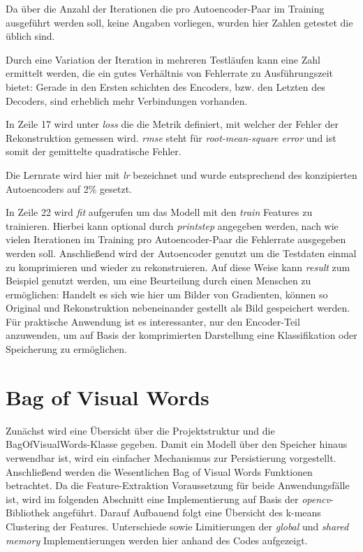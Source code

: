 Da über die Anzahl der Iterationen die pro Autoencoder-Paar im Training ausgeführt werden soll, keine Angaben vorliegen, wurden hier Zahlen getestet die üblich sind. 

Durch eine Variation der Iteration in mehreren Testläufen kann eine Zahl ermittelt werden, die ein gutes Verhältnis von Fehlerrate zu Ausführungszeit bietet: Gerade in den Ersten schichten des Encoders, bzw. den Letzten des Decoders, sind erheblich mehr Verbindungen vorhanden. 

In Zeile 17 wird unter \textit{loss} die die Metrik definiert, mit welcher der Fehler der Rekonstruktion gemessen wird. \textit{rmse} steht für \textit{root-mean-square error} und ist somit der gemittelte quadratische Fehler. 

Die Lernrate wird hier mit \textit{lr} bezeichnet und wurde entsprechend des konzipierten Autoencoders auf 2\% gesetzt.

In Zeile 22 wird \textit{fit} aufgerufen um das Modell mit den \textit{train} Features zu trainieren. Hierbei kann optional durch \textit{print\textunderscore step} angegeben werden, nach wie vielen Iterationen im Training pro Autoencoder-Paar die Fehlerrate ausgegeben werden soll.
Anschließend wird der Autoencoder genutzt um die Testdaten einmal zu komprimieren und wieder zu rekonstruieren. Auf diese Weise kann \textit{result} zum Beispiel genutzt werden, um eine Beurteilung durch einen Menschen zu ermöglichen: Handelt es sich wie hier um Bilder von Gradienten, können so Original und Rekonstruktion nebeneinander gestellt als Bild gespeichert werden. Für praktische Anwendung ist es interessanter, nur den Encoder-Teil anzuwenden, um auf Basis der komprimierten Darstellung eine Klassifikation oder Speicherung zu ermöglichen.  

\section{Bag of Visual Words}

Zunächst wird eine Übersicht über die Projektstruktur und die BagOfVisualWords-Klasse gegeben. Damit ein Modell über den Speicher hinaus verwendbar ist, wird ein einfacher Mechanismus zur Persistierung vorgestellt. Anschließend werden die Wesentlichen Bag of Visual Words Funktionen betrachtet. Da die Feature-Extraktion Voraussetzung für beide Anwendungsfälle ist, wird im folgenden Abschnitt eine Implementierung auf Basis der \textit{opencv}-Bibliothek angeführt. Darauf Aufbauend folgt eine Übersicht des k-means Clustering der Features. Unterschiede sowie Limitierungen der \textit{global} und \textit{shared memory} Implementierungen werden hier anhand des Codes aufgezeigt.

